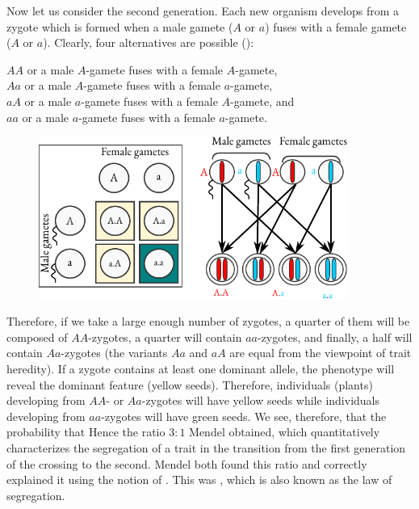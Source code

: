 Now let us consider the second generation. Each new organism
develops from a zygote which is formed when a male gamete ($A$ or $a$)
fuses with a female gamete ($A$ or $a$). Clearly, four alternatives are
possible ():
\begin{mybox}{}
 $AA$ or a male $A$-gamete fuses with a female $A$-gamete,\\
$Aa$ or a male $A$-gamete fuses with a female $a$-gamete,\\
$aA$ or a male $a$-gamete fuses with a female $A$-gamete, and\\
$aa$ or a male $a$-gamete fuses with a female $a$-gamete.
\end{mybox}


\begin{figure}[!ht]
\centering
\includegraphics[width=0.9\textwidth]{figures/genes1.pdf}
\end{figure}

 Therefore, if we take a large enough number of zygotes, a quarter of them will be composed of
$AA$-zygotes, a quarter will contain $aa$-zygotes, and finally, a half will
contain $Aa$-zygotes (the variants $Aa$ and $aA$ are equal from the
viewpoint of trait heredity). If a zygote contains at least one dominant
allele, the phenotype will reveal the dominant feature (yellow seeds).
Therefore, individuals (plants) developing from $AA$- or $Aa$-zygotes will
have yellow seeds while individuals developing from $aa$-zygotes will have
green seeds. We see, therefore, that the probability that  Hence the ratio $3:1$ Mendel obtained,
which quantitatively characterizes the segregation of a trait in the
transition from the first generation of the crossing to the second. Mendel
both found this ratio and correctly explained it using the notion of
. This was , which is also known as the law of segregation.

